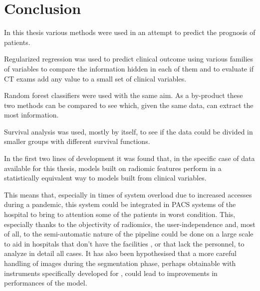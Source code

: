 \chapter{Conclusion}

In this thesis various methods were used in an attempt to predict the prognosis of \covid patients. 

Regularized regression was used to predict clinical outcome using various families of variables to compare the information hidden in each of them and to evaluate if CT exams add any value to a small set of clinical variables.

Random forest classifiers were used with the same aim. As a by-product these two methods can be compared to see which, given the same data, can extract the most information.

Survival analysis was used, mostly by itself, to see if the data could be divided in smaller groups with different survival functions.

In the first two lines of development it was found that, in the specific case of data available for this thesis, models built on radiomic features perform in a statistically equivalent way to models built from clinical variables.

This means that, especially in times of system overload due to increased accesses during a pandemic, this system could be integrated in PACS systems of the hospital to bring to attention some of the patients in worst condition.
This, especially thanks to the objectivity of radiomics, the user-independence and, most of all, to the semi-automatic nature of the pipeline could be done on a large scale to aid in hospitals that don't have the facilities , or that lack the personnel, to analyze in detail all cases.
It has also been hypothesised that a more careful handling of images during the segmentation phase, perhaps obtainable with instruments specifically developed for \covid, could lead to improvements in performances of the model.

